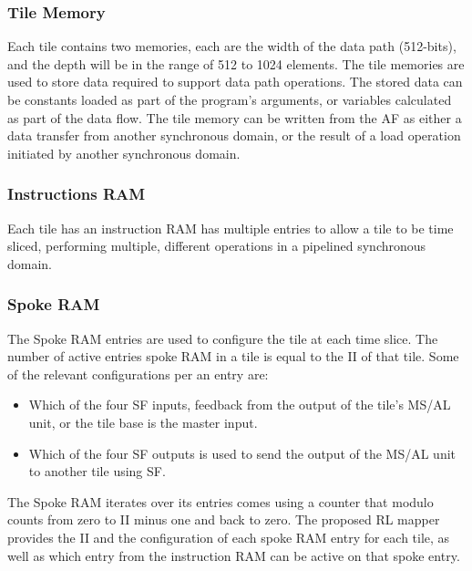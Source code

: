 \subsubsection{Tile Memory}
Each tile contains two memories, each are the width of the data path (512-bits), and the depth will be in the range of 512 to 1024 elements.
The tile memories are used to store data required to support data path operations.
The stored data can be constants loaded as part of the program's arguments, or variables calculated as part of the data flow.
The tile memory can be written from the AF as either a data transfer from another synchronous domain, or the result of a load operation
initiated by another synchronous domain.

\subsubsection{Instructions RAM}
Each tile has an instruction RAM has multiple entries to allow a tile to be time sliced, performing multiple, different operations in a pipelined synchronous domain.

\subsubsection{Spoke RAM}
The Spoke RAM entries are used to configure the tile at each time slice.
The number of active entries spoke RAM in a tile is equal to the II of that tile.
Some of the relevant configurations per an entry are: 

\begin{itemize}
  \item Which of the four SF inputs, feedback from the output of the tile's MS/AL unit, or the tile base is the master input.
  \item Which of the four SF outputs is used to send the output of the MS/AL unit to another tile using SF.
\end{itemize}

The Spoke RAM iterates over its entries comes using a counter that modulo counts from zero to II minus one and back to zero.
The proposed RL mapper provides the II and the configuration of each spoke RAM entry for each tile, as well as which entry from the instruction RAM can be active on that spoke entry.


